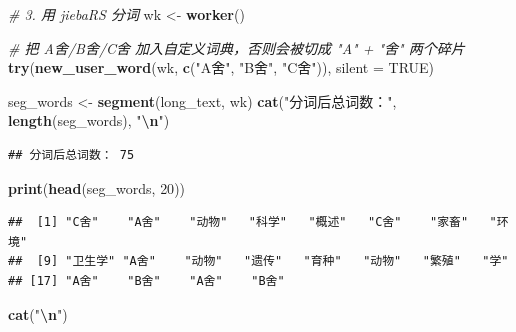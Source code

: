 \documentclass[
]{ctexart}
\newenvironment{Shaded}{\begin{snugshade}}{\end{snugshade}}
\newcommand{\AttributeTok}[1]{\textcolor[rgb]{0.13,0.29,0.53}{#1}}
\newcommand{\CommentTok}[1]{\textcolor[rgb]{0.56,0.35,0.01}{\textit{#1}}}
\newcommand{\ConstantTok}[1]{\textcolor[rgb]{0.56,0.35,0.01}{#1}}
\newcommand{\DecValTok}[1]{\textcolor[rgb]{0.00,0.00,0.81}{#1}}
\newcommand{\FunctionTok}[1]{\textcolor[rgb]{0.13,0.29,0.53}{\textbf{#1}}}
\newcommand{\NormalTok}[1]{#1}
\newcommand{\OtherTok}[1]{\textcolor[rgb]{0.56,0.35,0.01}{#1}}
\newcommand{\SpecialCharTok}[1]{\textcolor[rgb]{0.81,0.36,0.00}{\textbf{#1}}}
\newcommand{\StringTok}[1]{\textcolor[rgb]{0.31,0.60,0.02}{#1}}
\begin{document}
\begin{Shaded}
\begin{Highlighting}[]
\CommentTok{\# 3. 用 jiebaRS 分词}
\NormalTok{wk }\OtherTok{\textless{}{-}} \FunctionTok{worker}\NormalTok{()}

\CommentTok{\# 把 A舍/B舍/C舍 加入自定义词典，否则会被切成 "A" + "舍" 两个碎片}
\FunctionTok{try}\NormalTok{(}\FunctionTok{new\_user\_word}\NormalTok{(wk, }\FunctionTok{c}\NormalTok{(}\StringTok{"A舍"}\NormalTok{, }\StringTok{"B舍"}\NormalTok{, }\StringTok{"C舍"}\NormalTok{)), }\AttributeTok{silent =} \ConstantTok{TRUE}\NormalTok{)}

\NormalTok{seg\_words }\OtherTok{\textless{}{-}} \FunctionTok{segment}\NormalTok{(long\_text, wk)}
\FunctionTok{cat}\NormalTok{(}\StringTok{"分词后总词数："}\NormalTok{, }\FunctionTok{length}\NormalTok{(seg\_words), }\StringTok{"}\SpecialCharTok{\textbackslash{}n}\StringTok{"}\NormalTok{)}
\end{Highlighting}
\end{Shaded}

\begin{verbatim}
## 分词后总词数： 75
\end{verbatim}

\begin{Shaded}
\begin{Highlighting}[]
\FunctionTok{print}\NormalTok{(}\FunctionTok{head}\NormalTok{(seg\_words, }\DecValTok{20}\NormalTok{))}
\end{Highlighting}
\end{Shaded}

\begin{verbatim}
##  [1] "C舍"    "A舍"    "动物"   "科学"   "概述"   "C舍"    "家畜"   "环境"  
##  [9] "卫生学" "A舍"    "动物"   "遗传"   "育种"   "动物"   "繁殖"   "学"    
## [17] "A舍"    "B舍"    "A舍"    "B舍"
\end{verbatim}

\begin{Shaded}
\begin{Highlighting}[]
\FunctionTok{cat}\NormalTok{(}\StringTok{"}\SpecialCharTok{\textbackslash{}n}\StringTok{"}\NormalTok{)}
\end{Highlighting}
\end{Shaded}
\end{document}

